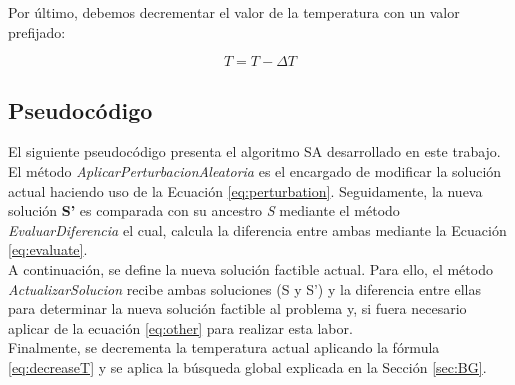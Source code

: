 Por último, debemos decrementar el valor de la temperatura con un valor prefijado: 

\begin{equation} \label{eq:decreaseT}
    T = T - \Delta T
\end{equation}

\subsection{Pseudocódigo}
El siguiente pseudocódigo presenta el algoritmo SA desarrollado en este trabajo. \\
El método \textit{AplicarPerturbacionAleatoria} es el encargado de modificar la solución actual haciendo uso de la Ecuación \ref{eq:perturbation}. Seguidamente, la nueva solución \textbf{S'} es comparada con su ancestro \textit{S} mediante el método \textit{EvaluarDiferencia} el cual, calcula la diferencia entre ambas mediante la Ecuación \ref{eq:evaluate}. \\
A continuación, se define la nueva solución factible actual. Para ello, el método \textit{ActualizarSolucion} recibe ambas soluciones (S y S') y la diferencia entre ellas para determinar la nueva solución factible al problema y, si fuera necesario aplicar de la ecuación \ref{eq:other} para realizar esta labor. \\
Finalmente, se decrementa la temperatura actual aplicando la fórmula \ref{eq:decreaseT} y se aplica la búsqueda global explicada en la Sección \ref{sec:BG}.


